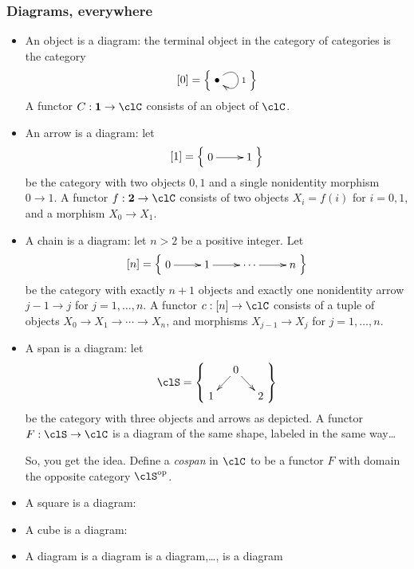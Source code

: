\documentclass[11pt]{article}
\begin{document}
\subsubsection{Diagrams, everywhere}
\begin{itemize}
\item An object is a diagram: the terminal object in the category of categories is the category 
\[[0] = \Big\{ 
\vcenter{\xymatrix{
	\bullet \ar@(ur,dr)^1
}}\Big\}\]
A functor $C : \textbf{1} \to \clC$ consists of an object of $\clC$.
\item An arrow is a diagram: let 
\[[1] = \Big\{ \vcenter{\xymatrix{0 \ar[r] & 1}} \Big\}\]
be the category with two objects $0,1$ and a single nonidentity morphism $0\to 1$. A functor $f : \textbf{2} \to \clC$ consists of two objects $X_i = f(i)$ for $i=0,1$, and a morphism $X_0\to X_1$.
\item A chain is a diagram: let $n>2$ be a positive integer. Let 
\[[n] = \Big\{ \vcenter{\xymatrix{0 \ar[r] & 1 \ar[r] & \cdots \ar[r] & n}} \Big\}\] be the category with exactly $n+1$ objects and exactly one nonidentity arrow $j-1\to j$ for $j=1,\dots,n$. A functor $c : [n] \to \clC$ consists of a tuple of objects $X_0 \to X_1 \to \cdots \to X_n$, and morphisms $X_{j-1}\to X_j$ for $j=1,\dots,n$. 
\item A span is a diagram: let 
\[
\clS = \left\{ \vcenter{\xymatrix@R=4mm@C=4mm{
	&0\ar[dr]\ar[dl]& \\
	1 && 2
}}	\right\}
\] be the category with three objects and arrows as depicted. A functor $F : \clS \to \clC$ is a diagram of the same shape, labeled in the same way\dots

So, you get the idea. Define a \emph{cospan} in $\clC$ to be a functor $F$ with domain the opposite category $\clS^\opp$.
\item A square is a diagram:
\item A cube is a diagram:
\item A diagram is a diagram is a diagram,\dots, is a diagram
\end{itemize}
\end{document}
